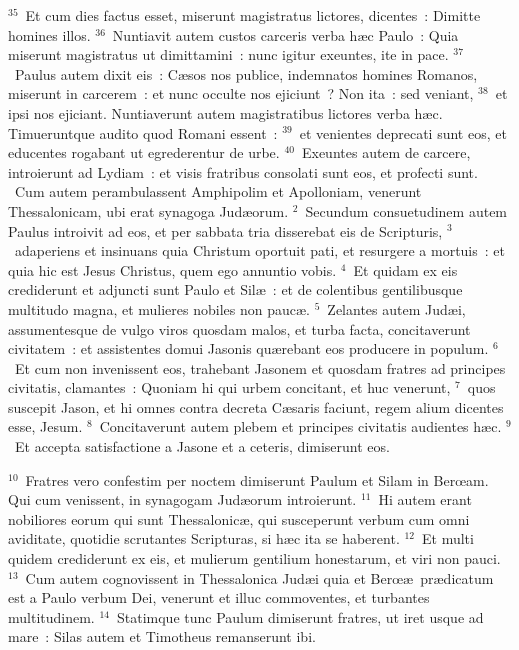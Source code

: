 ${}^{35}$~Et cum dies factus esset, miserunt magistratus lictores, dicentes~: Dimitte homines illos.
${}^{36}$~Nuntiavit autem custos carceris verba h\ae c Paulo~: Quia miserunt magistratus ut dimittamini~: nunc igitur exeuntes, ite in pace.
${}^{37}$~Paulus autem dixit eis~: C\ae sos nos publice, indemnatos homines Romanos, miserunt in carcerem~: et nunc occulte nos ejiciunt~? Non ita~: sed veniant,
${}^{38}$~et ipsi nos ejiciant. Nuntiaverunt autem magistratibus lictores verba h\ae c. Timueruntque audito quod Romani essent~:
${}^{39}$~et venientes deprecati sunt eos, et educentes rogabant ut egrederentur de urbe.
${}^{40}$~Exeuntes autem de carcere, introierunt ad Lydiam~: et visis fratribus consolati sunt eos, et profecti sunt.
~Cum autem perambulassent Amphipolim et Apolloniam, venerunt Thessalonicam, ubi erat synagoga Jud\ae orum.
${}^{2}$~Secundum consuetudinem autem Paulus introivit ad eos, et per sabbata tria disserebat eis de Scripturis,
${}^{3}$~adaperiens et insinuans quia Christum oportuit pati, et resurgere a mortuis~: et quia hic est Jesus Christus, quem ego annuntio vobis.
${}^{4}$~Et quidam ex eis crediderunt et adjuncti sunt Paulo et Sil\ae~: et de colentibus gentilibusque multitudo magna, et mulieres nobiles non pauc\ae .
${}^{5}$~Zelantes autem Jud\ae i, assumentesque de vulgo viros quosdam malos, et turba facta, concitaverunt civitatem~: et assistentes domui Jasonis qu\ae rebant eos producere in populum.
${}^{6}$~Et cum non invenissent eos, trahebant Jasonem et quosdam fratres ad principes civitatis, clamantes~: Quoniam hi qui urbem concitant, et huc venerunt,
${}^{7}$~quos suscepit Jason, et hi omnes contra decreta C\ae saris faciunt, regem alium dicentes esse, Jesum.
${}^{8}$~Concitaverunt autem plebem et principes civitatis audientes h\ae c.
${}^{9}$~Et accepta satisfactione a Jasone et a ceteris, dimiserunt eos.


${}^{10}$~Fratres vero confestim per noctem dimiserunt Paulum et Silam in Berœam. Qui cum venissent, in synagogam Jud\ae orum introierunt.
${}^{11}$~Hi autem erant nobiliores eorum qui sunt Thessalonic\ae , qui susceperunt verbum cum omni aviditate, quotidie scrutantes Scripturas, si h\ae c ita se haberent.
${}^{12}$~Et multi quidem crediderunt ex eis, et mulierum gentilium honestarum, et viri non pauci.
${}^{13}$~Cum autem cognovissent in Thessalonica Jud\ae i quia et Berœ\ae\ pr\ae dicatum est a Paulo verbum Dei, venerunt et illuc commoventes, et turbantes multitudinem.
${}^{14}$~Statimque tunc Paulum dimiserunt fratres, ut iret usque ad mare~: Silas autem et Timotheus remanserunt ibi.


